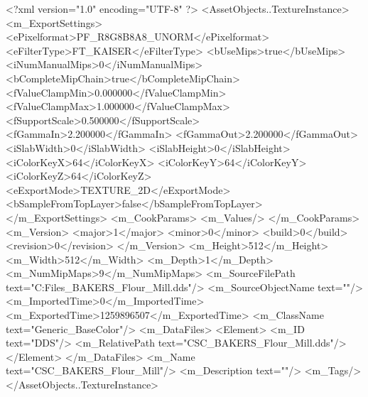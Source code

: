 <?xml version="1.0" encoding="UTF-8" ?>
<AssetObjects..TextureInstance>
	<m_ExportSettings>
		<ePixelformat>PF_R8G8B8A8_UNORM</ePixelformat>
		<eFilterType>FT_KAISER</eFilterType>
		<bUseMips>true</bUseMips>
		<iNumManualMips>0</iNumManualMips>
		<bCompleteMipChain>true</bCompleteMipChain>
		<fValueClampMin>0.000000</fValueClampMin>
		<fValueClampMax>1.000000</fValueClampMax>
		<fSupportScale>0.500000</fSupportScale>
		<fGammaIn>2.200000</fGammaIn>
		<fGammaOut>2.200000</fGammaOut>
		<iSlabWidth>0</iSlabWidth>
		<iSlabHeight>0</iSlabHeight>
		<iColorKeyX>64</iColorKeyX>
		<iColorKeyY>64</iColorKeyY>
		<iColorKeyZ>64</iColorKeyZ>
		<eExportMode>TEXTURE_2D</eExportMode>
		<bSampleFromTopLayer>false</bSampleFromTopLayer>
	</m_ExportSettings>
	<m_CookParams>
		<m_Values/>
	</m_CookParams>
	<m_Version>
		<major>1</major>
		<minor>0</minor>
		<build>0</build>
		<revision>0</revision>
	</m_Version>
	<m_Height>512</m_Height>
	<m_Width>512</m_Width>
	<m_Depth>1</m_Depth>
	<m_NumMipMaps>9</m_NumMipMaps>
	<m_SourceFilePath text="C:\Users\Shadow\Desktop\Working Files\Textures\CSC_BAKERS_Flour_Mill.dds"/>
	<m_SourceObjectName text=""/>
	<m_ImportedTime>0</m_ImportedTime>
	<m_ExportedTime>1259896507</m_ExportedTime>
	<m_ClassName text="Generic_BaseColor"/>
	<m_DataFiles>
		<Element>
			<m_ID text="DDS"/>
			<m_RelativePath text="CSC_BAKERS_Flour_Mill.dds"/>
		</Element>
	</m_DataFiles>
	<m_Name text="CSC_BAKERS_Flour_Mill"/>
	<m_Description text=""/>
	<m_Tags/>
</AssetObjects..TextureInstance>

